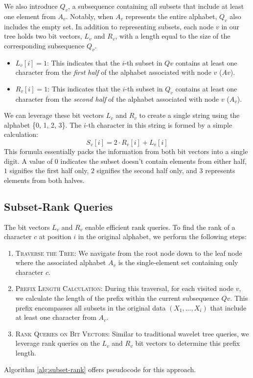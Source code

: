 \noindent We also introduce $Q_v$, a subsequence containing all subsets that include at least one element from $A_v$. Notably, when $A_v$ represents the entire alphabet, $Q_v$ also includes the empty set. In addition to representing subsets, each node $v$ in our tree holds two bit vectors, $L_v$ and $R_v$, with a length equal to the size of the corresponding subsequence $Q_v$.
\begin{itemize}
    \item $L_v[i] = 1$: This indicates that the $i$-th subset in $Qv$ contains at least one character from the \emph{first half} of the alphabet associated with node $v$ ($Av$).
    \item $R_v[i] = 1$: This indicates that the $i$-th subset in $Q_v$ contains at least one character from the \emph{second half} of the alphabet associated with node $v$ ($A_v$).
\end{itemize}
We can leverage these bit vectors $L_v$ and $R_v$ to create a single string using the alphabet \{0, 1, 2, 3\}. The $i$-th character in this string is formed by a simple calculation:
\begin{equation}
    S_v[i] = 2 \cdot R_v[i] + L_v[i]
\end{equation}
This formula essentially packs the information from both bit vectors into a single digit. A value of $0$ indicates the subset doesn't contain elements from either half, $1$ signifies the first half only, $2$ signifies the second half only, and $3$ represents elements from both halves. \vspace{0.4cm}

\subsection{Subset-Rank Queries}

\noindent The bit vectors $L_v$ and $R_v$ enable efficient rank queries. To find the rank of a character $c$ at position $i$ in the original alphabet, we perform the following steps:
\begin{enumerate}
    \item \textsc{Traverse the Tree}: We navigate from the root node down to the leaf node where the associated alphabet $A_v$ is the single-element set containing only character $c$.
    \item \textsc{Prefix Length Calculation}: During this traversal, for each visited node $v$, we calculate the length of the prefix within the current subsequence $Qv$. This prefix encompasses all subsets in the original data $(X_1,\dots, X_i)$ that include at least one character from $A_v$.
    \item \textsc{Rank Queries on Bit Vectors}: Similar to traditional wavelet tree queries, we leverage rank queries on the $L_v$ and $R_v$ bit vectors to determine this prefix length.
\end{enumerate}
Algorithm \ref{alg:subset-rank} offers pseudocode for this approach.



